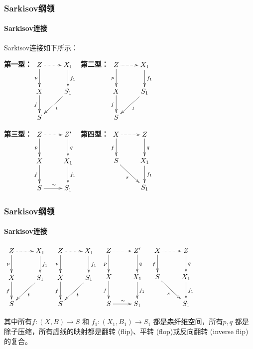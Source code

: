 \documentclass[10pt]{ctexbeamer}
\begin{document}
\begin{frame}[shrink]
  \frametitle{Sarkisov纲领}
  \framesubtitle{Sarkisov连接}
  Sarkisov连接如下所示：
  \begin{center}
  \textbf{第一型：}$\xymatrix{
      Z\ar[d]_{p}\ar@{.>}[r]&X_{1}\ar[d]^{f_1}\\
      X\ar[d]_{f}&S_1\ar[dl]^{t}\\
  S &}$
  \textbf{第二型：}$\xymatrix{
      Z\ar[d]_{p}\ar@{.>}[r]&X_{1}\ar[d]^{f_1}\\
      X\ar[d]_{f}&S_1\ar[dl]^{t}\\
  S &}$
  \end{center}
  \begin{center}
    \textbf{第三型：}$\xymatrix{
        Z\ar[d]_{p}\ar@{.>}[r]&Z'\ar[d]^{q}\\
        X\ar[d]_{f}&X_1\ar[d]^{f_1}\\
    S\ar[r]^{\sim}&S_1}$
  \textbf{第四型：}$\xymatrix{
      X\ar@{.>}[r]\ar[d]_{f}& Z\ar[d]^q \\
      S\ar[rd]_{s}         & X_{1}\ar[d]^{f_{1}}\\
      &S_{1}
      }$
  \end{center}
\end{frame}

\begin{frame}[shrink]
  \frametitle{Sarkisov纲领}
  \framesubtitle{Sarkisov连接}
  \begin{center}
  $\xymatrix{
      Z\ar[d]_{p}\ar@{.>}[r]&X_{1}\ar[d]^{f_1}\\
      X\ar[d]_{f}&S_1\ar[dl]^{t}\\
  S &}$
  $\xymatrix{
      Z\ar[d]_{p}\ar@{.>}[r]&X_{1}\ar[d]^{f_1}\\
      X\ar[d]_{f}&S_1\ar[dl]^{t}\\
  S &}$
  $\xymatrix{
      Z\ar[d]_{p}\ar@{.>}[r]&Z'\ar[d]^{q}\\
      X\ar[d]_{f}&X_1\ar[d]^{f_1}\\
  S\ar[r]^{\sim}&S_1}$
$\xymatrix{
    X\ar@{.>}[r]\ar[d]_{f}& Z\ar[d]^q \\
    S\ar[rd]_{s}         & X_{1}\ar[d]^{f_{1}}\\
    &S_{1}
    }$
\end{center}
  其中所有$ f:(X, B)\to S $ 和 $ f_1:(X_1, B_1)\to S_1 $ 都是森纤维空间，所有$p,q$ 都是除子压缩，所有虚线的映射都是翻转 (flip)、平转 (flop)或反向翻转 (inverse flip)的复合。
\end{frame}
\end{document}
